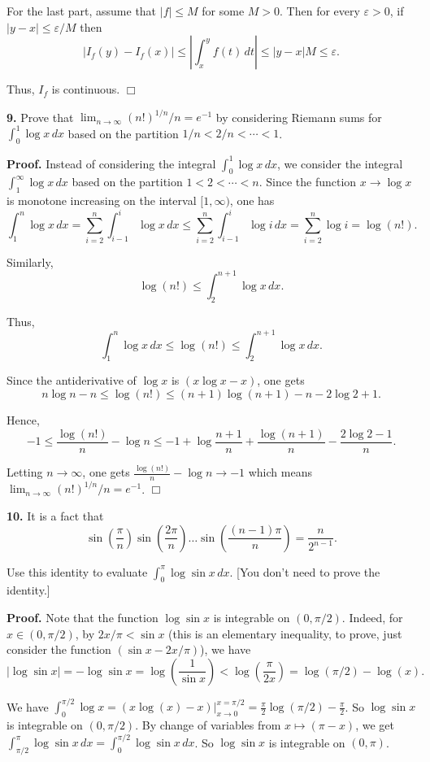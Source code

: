 \documentclass{article}
\begin{document}
For the last part, assume that $|f|\le M$ for some $M > 0$. Then for
every $\varepsilon>0$, if $|y-x|\le \varepsilon / M$ then
\[|I_f(y) - I_f(x)|\le \left|\int_{x}^y  f(t)\, dt \right| \le |y-x|M \le \varepsilon.\]

Thus, $I_f$ is continuous. $\Box$

    \textbf{9.} Prove that $\lim_{n\to\infty} (n!)^{1/n}/n = e^{−1}$ by
considering Riemann sums for $\int_0^1 \log x\,dx$ based on the
partition $1/n < 2/n < \cdots < 1$.

    \textbf{Proof.} Instead of considering the integral
$\int_0^1 \log x \, dx$, we consider the integral
$\int_1^{\infty} \log x \,dx$ based on the partition
$1 < 2 < \cdots < n$. Since the function $x\to \log x$ is monotone
increasing on the interval $[1, \infty)$, one has
\[\int_{1}^{n}\log x\,dx = \sum_{i=2}^{n}\int_{i-1}^{i}\log x\, dx \le \sum_{i=2}^{n}\int_{i-1}^{i}\log i\, dx=\sum_{i=2}^{n}\log i = \log(n!).
\]

Similarly, \[\log (n!)\le \int_{2}^{n+1}\log x\,dx.\]

Thus,
\[\int_{1}^{n}\log x\,dx\le \log (n!)\le \int_{2}^{n+1}\log x\,dx.\]

Since the antiderivative of $\log x$ is $(x \log x - x)$, one gets
\[ n\log n-n\le \log (n!)\le (n+1)\log(n+1) - n-2\log 2+1.\]

Hence,
\[-1\le \frac{\log(n!)}{n}-\log n\le -1 +\log\frac{n+1}{n}+\frac{\log (n+1)}{n}-\frac{2\log 2-1}{n}.\]

Letting $n\to \infty$, one gets $\frac{\log(n!)}{n}-\log n\to -1$ which
means $\lim_{n\to\infty} (n!)^{1/n}/n = e^{−1}$. $\Box$

    \textbf{10.} It is a fact that
\[\sin\left(\frac{\pi}{n}\right)\sin\left(\frac{2\pi}{n}\right)\ldots \sin\left(\frac{(n-1)\pi}{n}\right) = \frac{n}{2^{n-1}}.\]

Use this identity to evaluate $\int_0^{\pi}\log \sin x\,dx$. {[}You
don't need to prove the identity.{]}

    \textbf{Proof.} Note that the function $\log \sin x$ is integrable on
$(0,\pi/2)$. Indeed, for $x \in (0, \pi/2)$, by $2x/\pi <  \sin x$ (this
is an elementary inequality, to prove, just consider the function
$(\sin x - 2x/\pi)$), we have
\[|\log\sin x| = - \log \sin x = \log \left(\frac{1}{\sin x}\right) < \log \left (\frac{\pi}{2 x}\right) =  \log(\pi/2) - \log (x).\]

We have
$\int_0^{\pi/2} \log x =( x \log(x) - x)|_{x\to 0}^{x = \pi/2} = \frac{\pi}{2} \log (\pi/2) - \frac{\pi}{2}$.
So $\log\sin x$ is integrable on $(0,\pi/2)$. By change of variables
from $x \mapsto (\pi - x)$, we get
$\int_{\pi/2}^{\pi} \log \sin x \,dx = \int_{0}^{\pi/2} \log \sin x \,dx$.
So $\log\sin x$ is integrable on $(0,\pi)$.
\end{document}
